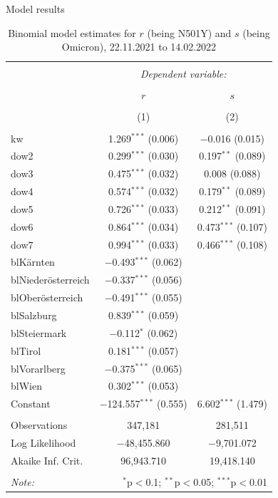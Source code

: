 \documentclass[
  ignorenonframetext,
  aspectratio=169,
]{beamer}
\begin{document}
\begin{frame}{Model results}
\protect\hypertarget{model-results}{}
\begin{minipage}{.60\textwidth}

\begin{table}[!htbp] \centering 
\tiny
  \caption{Binomial model estimates for $r$ (being N501Y) and $s$ (being Omicron), 22.11.2021 to 14.02.2022} 
\begin{tabular}{@{\extracolsep{5pt}}lcc} 
\\[-1.8ex]\hline 
\hline \\[-1.8ex] 
 & \multicolumn{2}{c}{\textit{Dependent variable:}} \\ 
\cline{2-3} 
\\[-1.8ex] & $r$ & $s$ \\ 
\\[-1.8ex] & (1) & (2)\\ 
\hline \\[-1.8ex] 
 kw & 1.269$^{***}$ (0.006) & $-$0.016 (0.015) \\ 
  dow2 & 0.299$^{***}$ (0.030) & 0.197$^{**}$ (0.089) \\ 
  dow3 & 0.475$^{***}$ (0.032) & 0.008 (0.088) \\ 
  dow4 & 0.574$^{***}$ (0.032) & 0.179$^{**}$ (0.089) \\ 
  dow5 & 0.726$^{***}$ (0.033) & 0.212$^{**}$ (0.091) \\ 
  dow6 & 0.864$^{***}$ (0.034) & 0.473$^{***}$ (0.107) \\ 
  dow7 & 0.994$^{***}$ (0.033) & 0.466$^{***}$ (0.108) \\ 
  blKärnten & $-$0.493$^{***}$ (0.062) &  \\ 
  blNiederösterreich & $-$0.337$^{***}$ (0.056) &  \\ 
  blOberösterreich & $-$0.491$^{***}$ (0.055) &  \\ 
  blSalzburg & 0.839$^{***}$ (0.059) &  \\ 
  blSteiermark & $-$0.112$^{*}$ (0.062) &  \\ 
  blTirol & 0.181$^{***}$ (0.057) &  \\ 
  blVorarlberg & $-$0.375$^{***}$ (0.065) &  \\ 
  blWien & 0.302$^{***}$ (0.053) &  \\ 
  Constant & $-$124.557$^{***}$ (0.555) & 6.602$^{***}$ (1.479) \\ 
 \hline \\[-1.8ex] 
Observations & 347,181 & 281,511 \\ 
Log Likelihood & $-$48,455.860 & $-$9,701.072 \\ 
Akaike Inf. Crit. & 96,943.710 & 19,418.140 \\ 
\hline 
\hline \\[-1.8ex] 
\textit{Note:}  & \multicolumn{2}{r}{$^{*}$p$<$0.1; $^{**}$p$<$0.05; $^{***}$p$<$0.01} \\ 
\end{tabular} 
\end{table}


\end{minipage}
\end{frame}
\end{document}
